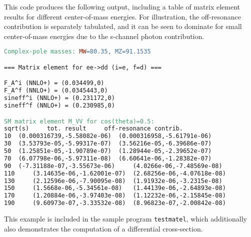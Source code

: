 \documentclass[12pt]{article}
\begin{document}
\noindent
This code produces the following output, including a table of matrix element results for different center-of-mass energies. For illustration, the off-resonance contribution is separately tabulated, and it can be seen to dominate for small center-of-mass energies due to the s-channel photon contribution.

\begin{lstlisting}[language=make]
Complex-pole masses: MW=80.35, MZ=91.1535

=== Matrix element for ee->dd (i=e, f=d) ===

F_A^i (NNLO+) = (0.034499,0)
F_A^f (NNLO+) = (0.0345443,0)
sineff^i (NNLO+) = (0.231172,0)
sineff^f (NNLO+) = (0.230985,0)

SM matrix element M_VV for cos(theta)=0.5: 
sqrt(s)		tot. result		off-resonance contrib.
10 	(0.000316739,-5.58082e-06) 	(0.000316958,-5.61791e-06)
30 	(3.53793e-05,-5.99317e-07) 	(3.56216e-05,-6.39686e-07)
50 	(1.25851e-05,-1.90789e-07) 	(1.28944e-05,-2.39652e-07)
70 	(6.07798e-06,-5.97311e-08) 	(6.60641e-06,-1.28382e-07)
90 	(-7.31188e-07,-3.55673e-06) 	(4.0266e-06,-7.48569e-08)
110 	(3.14635e-06,-1.62001e-07) 	(2.68256e-06,-4.07618e-08)
130 	(2.12596e-06,-7.90095e-08) 	(1.91932e-06,-3.2315e-08)
150 	(1.5668e-06,-5.34561e-08) 	(1.44139e-06,-2.64893e-08)
170 	(1.20884e-06,-3.97403e-08) 	(1.12232e-06,-2.15845e-08)
190 	(9.60973e-07,-3.33532e-08) 	(8.96823e-07,-2.00842e-08)
\end{lstlisting}

\noindent 
This example is included in the sample program {\tt testmatel}, which additionally also demonstrates the computation of a differential cross-section.

{}

\end{document}
